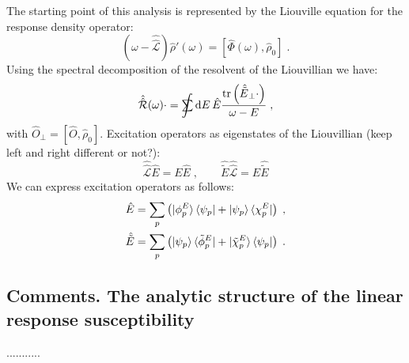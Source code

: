 \documentclass[reprint,aps,prb]{revtex4-1}
\newcommand{\dd}{{\rm d}}
\newcommand{\sint}{\mathrlap{\displaystyle\int}
\mathrlap{\textstyle\sum}
\phantom{\mathrlap{\displaystyle
\int}\textstyle\sum}}
\newcommand{\be}{\begin{equation}}
\newcommand{\ee}{\end{equation}}
\newcommand{\nn}{\notag}
\newcommand{\qq}{\qquad}
\newcommand{\lb}{\label}
\newcommand{\op}[1]{\hat {#1}}
\newcommand{\sop}[1]{\op{\op {#1}}}
\newcommand{\commutator}[2]{\left[ {#1} , {#2} \right]}
\newcommand{\trace}[1]{\mathrm{tr}\left(#1\right)}
\newcommand{\opskew}[1]{{\op {#1}}_{\perp}}
\newcommand{\tket}[1]{| \tilde #1 \rangle}
\newcommand{\tbra}[1]{\langle \tilde #1 |}
\newcommand{\dmnot}{\op{\rho}_0}
\newcommand{\dm}{\op{\rho}}
\newcommand{\Liouv}{\sop{\mathcal L}}
\begin{document}
The starting point of this analysis is represented by the Liouville equation for the response density operator:
\be\lb{LiouvillianRhopomegaDef1}
\left(\omega - \Liouv\right) \dm'(\omega) =  \commutator{\op\Phi(\omega)}{\dmnot} \;.
\ee
Using the spectral decomposition of the resolvent of the Liouvillian we have:
\be\lb{RhopExcitationDef1}
\sop{{\cal R}}(\omega) \cdot   =
\sint\dd E \, \op E
\frac{\trace{\opskew{\tilde E}\cdot}}{\omega-E} \;,
\ee
with $\opskew{O} = \commutator{\op O}{\dmnot}$. 
Excitation operators as eigenstates of the Liouvillian (keep left and right different or not?):
\be\lb{ExcitationOperatorsDef1}
\Liouv \op E = E \op E \;, \qq
 \op{\tilde E} \Liouv = E \op{\tilde E}
\ee
We can express excitation operators as follows:
\begin{align}\lb{ExcitationOperatorsDef2}
\op E &= \sum_p \left( \ket{\phi^E_p}\bra{\psi_p} + \ket{\psi_p} \bra{\chi^E_p}\right)\;, \nn \\
\op {\tilde E} &= \sum_p \left( \ket{\psi_p} \tbra{\phi^E_p} + \tket{\chi^E_p}\bra{\psi_p} \right)\;.
\end{align}


\subsection{Comments. The analytic structure of the linear response susceptibility}

...........



\end{document}
